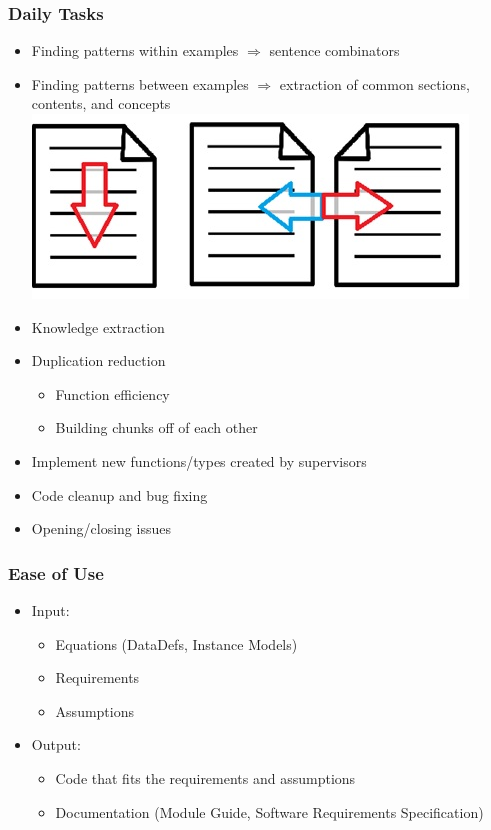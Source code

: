 \documentclass{beamer}
\begin{document}
\begin{frame}
\frametitle{Daily Tasks}
\begin{itemize}
 \item<1-> Finding patterns within examples $\Rightarrow$ sentence combinators
 \item<1-> Finding patterns between examples $\Rightarrow$ extraction of common sections, contents, and concepts
 \includegraphics[scale=0.70]{../WG2_11/WinAndBwExamples.jpg}
 \item<2-> Knowledge extraction
 \item<2-> Duplication reduction
   \begin{itemize}
     \item Function efficiency
     \item Building chunks off of each other
   \end{itemize}
 \item<3-> Implement new functions/types created by supervisors
 \item<4-> Code cleanup and bug fixing
 \item<5-> Opening/closing issues
\end{itemize}
\end{frame}

\begin{frame}
\frametitle{Ease of Use}
\begin{itemize}
 \item<1-> Input:
  \begin{itemize}
   \item<2-> Equations (DataDefs, Instance Models)
   \item<3-> Requirements
   \item<4-> Assumptions
  \end{itemize}
 \item<5-> Output:
  \begin{itemize}
   \item<6-> Code that fits the requirements and assumptions
   \item<7-> Documentation (Module Guide, Software Requirements Specification)
  \end{itemize}
\end{itemize}
\end{frame}
\end{document}
